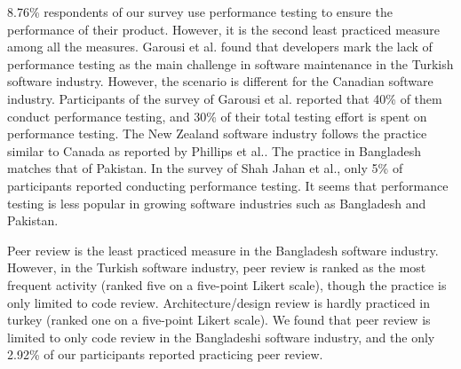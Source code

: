 8.76\% respondents of our survey use performance testing to ensure the performance of their product.  However, it is the second least practiced measure among all the measures. Garousi et al.\cite{Garousi2015} found that developers mark the lack of performance testing as the main challenge in software maintenance in the Turkish software industry. However, the scenario is different for the Canadian software industry. Participants of the survey of Garousi et al.\cite{Garousi2013} reported that 40\% of them conduct performance testing, and 30\% of their total testing effort is spent on performance testing. The New Zealand software industry follows the practice similar to Canada as reported by Phillips et al.\cite{Phillips2003}. %
The practice in Bangladesh matches that of Pakistan. 
In the survey of Shah Jahan et al.\cite{Jahan2019}, only 5\% of participants reported conducting performance testing. It seems that performance testing is less popular in growing software industries such as Bangladesh and Pakistan.

Peer review is the least practiced measure in the Bangladesh software industry. However, in the Turkish software industry, peer review is ranked as the most frequent activity\cite{Garousi2015} (ranked five on a five-point Likert scale), though the practice is only limited to code review. Architecture/design review is hardly practiced in turkey (ranked one on a five-point Likert scale). We found that peer review is limited to only code review in the Bangladeshi software industry, and the only 2.92\% of our participants reported practicing peer review.

